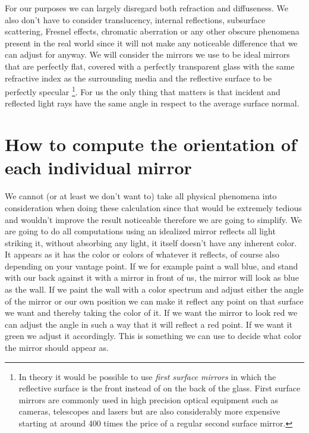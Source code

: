 \documentclass{article}
\begin{document}
For our purposes we can largely disregard both refraction and
diffuseness. We also don't have to consider translucency, internal
reflections, subsurface scattering, Fresnel effects, chromatic
aberration or any other obscure phenomena present in the real world
since it will not make any noticeable difference that we can adjust for
anyway. We will consider the mirrors we use to be ideal mirrors that are
perfectly flat, covered with a perfectly transparent glass with the same
refractive index as the surrounding media and the reflective surface to
be perfectly specular \footnote{In theory it would be possible to use
  \emph{first surface mirrors} in which the reflective surface is the
  front instead of on the back of the glass. First surface mirrors are
  commonly used in high precision optical equipment such as cameras,
  telescopes and lasers but are also considerably more expensive
  starting at around 400 times the price of a regular second surface
  mirror.}. For us the only thing that matters is that incident and
reflected light rays have the same angle in respect to the average
surface normal.


\section{How to compute the orientation of each individual
mirror}

We cannot (or at least we don't want to) take all physical phenomena
into consideration when doing these calculation since that would be
extremely tedious and wouldn't improve the result noticeable therefore
we are going to simplify. We are going to do all computations using an idealized
mirror reflects all light striking it, without absorbing any light, it
itself doesn't have any inherent color. It appears as it has the color
or colors of whatever it reflects, of course also depending on your
vantage point. If we for example paint a wall blue, and stand with our
back against it with a mirror in front of us, the mirror will look as
blue as the wall. If we paint the wall with a color spectrum and adjust
either the angle of the mirror or our own position we can make it
reflect any point on that surface we want and thereby taking the color
of it. If we want the mirror to look red we can adjust the angle in such
a way that it will reflect a red point. If we want it green we adjust it
accordingly. This is something we can use to decide what color the
mirror should appear as.
\end{document}
